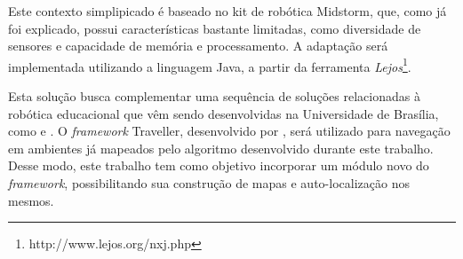 Este contexto simplipicado é baseado no kit de robótica Midstorm, que, como já foi explicado, possui características bastante limitadas, como diversidade de sensores e capacidade de memória e processamento. A adaptação será implementada utilizando a linguagem Java, a partir da ferramenta \textit{Lejos}\footnote{http://www.lejos.org/nxj.php}.

Esta solução busca complementar uma sequência de soluções relacionadas à robótica educacional que vêm sendo desenvolvidas na Universidade de Brasília, como \cite{tccCarol} e \cite{tccRodrigo}. O \textit{framework} Traveller, desenvolvido por \cite{tccRodrigo}, será utilizado para navegação em ambientes já mapeados pelo algoritmo desenvolvido durante este trabalho. Desse modo, este trabalho tem como objetivo incorporar um módulo novo do \textit{framework}, possibilitando sua construção de mapas e auto-localização nos mesmos.


